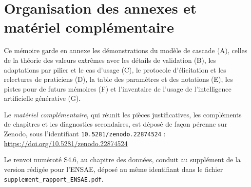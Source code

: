 \documentclass[12pt,a4paper]{report}
\begin{document}
\chapter*{Organisation des annexes et matériel complémentaire}

Ce mémoire garde en annexe les démonstrations du modèle de cascade (A), celles de la théorie des
valeurs extrêmes avec les détails de validation (B), les adaptations par pilier et le cas d'usage (C), le
protocole d'élicitation et les relectures de praticiens (D), la table des paramètres et des notations
(E), les pistes pour de futurs mémoires (F) et l'inventaire de l'usage de l'intelligence artificielle
générative (G).

Le \emph{matériel complémentaire}, qui réunit les pièces justificatives, les compléments de chapitres et
les diagnostics secondaires, est déposé de façon pérenne sur Zenodo, sous l'identifiant
\texttt{10.5281/zenodo.22874524} :
\url{https://doi.org/10.5281/zenodo.22874524}

Le renvoi numéroté S4.6, au chapitre des données, conduit au supplément de la version rédigée pour
l'ENSAE, déposé au même identifiant dans le fichier \texttt{supplement\_rapport\_ENSAE.pdf}.


\end{document}
